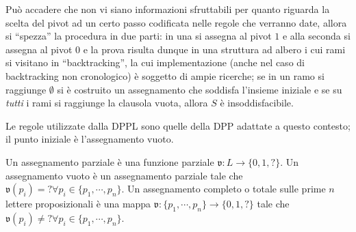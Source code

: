 Può accadere che non vi siano informazioni sfruttabili per quanto riguarda 
la scelta del pivot ad un certo passo codificata nelle regole che verranno 
date, allora si ``spezza'' la procedura in due parti: in una si assegna al pivot 
$1$ e alla seconda si assegna al pivot $0$ e la prova risulta dunque in una 
struttura ad albero i cui rami si visitano in ``backtracking'', la cui implementazione
(anche nel caso di backtracking non cronologico) è soggetto di ampie ricerche; 
se in un ramo si raggiunge $\emptyset$ si è costruito un assegnamento che soddisfa 
l'insieme iniziale e se su \textit{tutti} i rami si raggiunge la clausola 
vuota, allora $S$ è insoddisfacibile.

Le regole utilizzate dalla DPPL sono quelle della DPP adattate a questo contesto; 
il punto iniziale è l'assegnamento vuoto. 

\begin{defi}
        Un assegnamento parziale è una funzione parziale $\mathfrak{v}: L \rightarrow \{0,1,?\}$. 
        Un assegnamento vuoto è un assegnamento parziale tale che 
        $\mathfrak{v}(p_i) = ? \forall p_i \in \{p_1, \cdots, p_n\}$.
        Un assegnamento completo o totale sulle prime $n$ lettere proposizionali 
        è una mappa $\mathfrak{v}: \{p_1, \cdots, p_n\} \rightarrow \{0,1,?\}$ 
        tale che $\mathfrak{v}(p_i) \neq ? \forall p_i \in \{p_1, \cdots, p_n\}$.
\end{defi}

